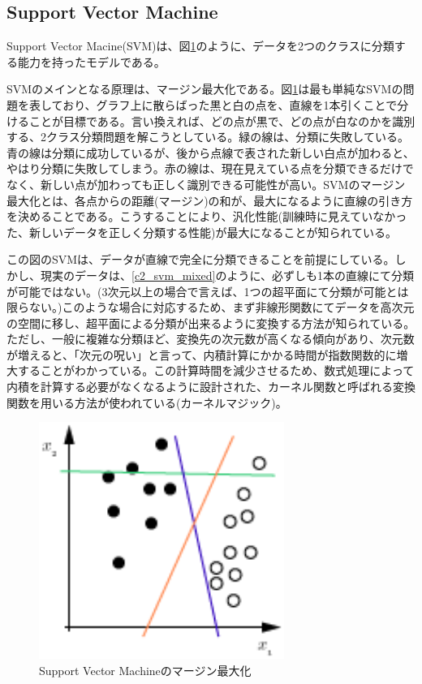 
\subsection{Support Vector Machine}
Support Vector Macine(SVM)は、図\ref{c2_svm}のように、データを2つのクラスに分類する能力を持ったモデルである\cite{cortes1995support-vector}。\par
SVMのメインとなる原理は、マージン最大化である。図\ref{c2_svm}は最も単純なSVMの問題を表しており、グラフ上に散らばった黒と白の点を、直線を1本引くことで分けることが目標である。言い換えれば、どの点が黒で、どの点が白なのかを識別する、2クラス分類問題を解こうとしている。緑の線は、分類に失敗している。青の線は分類に成功しているが、後から点線で表された新しい白点が加わると、やはり分類に失敗してしまう。赤の線は、現在見えている点を分類できるだけでなく、新しい点が加わっても正しく識別できる可能性が高い。SVMのマージン最大化とは、各点からの距離(マージン)の和が、最大になるように直線の引き方を決めることである。こうすることにより、汎化性能(訓練時に見えていなかった、新しいデータを正しく分類する性能)が最大になることが知られている。\par
この図のSVMは、データが直線で完全に分類できることを前提にしている。しかし、現実のデータは、\ref{c2_svm_mixed}のように、必ずしも1本の直線にて分類が可能ではない。(3次元以上の場合で言えば、1つの超平面にて分類が可能とは限らない。)このような場合に対応するため、まず非線形関数にてデータを高次元の空間に移し、超平面による分類が出来るように変換する方法が知られている\cite{burges1998tutorial}。ただし、一般に複雑な分類ほど、変換先の次元数が高くなる傾向があり、次元数が増えると、「次元の呪い」と言って、内積計算にかかる時間が指数関数的に増大することがわかっている\cite{bellman1961adaptive}。この計算時間を減少させるため、数式処理によって内積を計算する必要がなくなるように設計された、カーネル関数と呼ばれる変換関数を用いる方法が使われている(カーネルマジック)。
\begin{figure}[tbp]
 \centering
  \includegraphics[width=80mm]{img/c2/svm}
 \caption{Support Vector Machineのマージン最大化}
 \label{c2_svm}
\end{figure}
